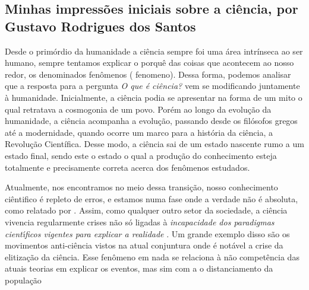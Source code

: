 \subsection{Minhas impressões iniciais sobre a ciência, por Gustavo Rodrigues dos Santos}

Desde o primórdio da humanidade a ciência sempre foi uma área intrínseca ao ser humano, sempre tentamos explicar o porquê das coisas que acontecem ao nosso redor, os denominados fenômenos ( \gls{fenomeno}). Dessa forma, podemos analisar que a resposta para a pergunta \textit{O que é ciência?} vem se modificando juntamente à humanidade. Inicialmente, a ciência podia se apresentar na forma de um mito o qual retratava a cosmogonia de um povo. Porém ao longo da evolução da humanidade, a ciência acompanha a evolução, passando desde os filósofos gregos até a modernidade, quando ocorre um marco para a história da ciência, a Revolução Científica. Desse modo, a ciência sai de um estado nascente rumo a um estado final, sendo este o estado o qual a produção do conhecimento esteja totalmente e precisamente correta acerca dos fenômenos estudados.

Atualmente, nos encontramos no meio dessa transição, nosso conhecimento ciêntifico é repleto de erros, e estamos numa fase onde a verdade não é absoluta, como relatado por \citet{fernandes_consideracoes_2021}. Assim, como qualquer outro setor da sociedade, a ciência vivencia regularmente crises não só ligadas à \textit{incapacidade dos paradigmas cientı́ficos vigentes para explicar a realidade} \citep{fernandes_consideracoes_2021}. Um grande exemplo disso são os movimentos anti-ciência vistos na atual conjuntura onde é notável a crise da elitização da ciência. Esse fenômeno em nada se relaciona à não competência das atuais teorias em explicar os eventos, mas sim com a o distanciamento da população


